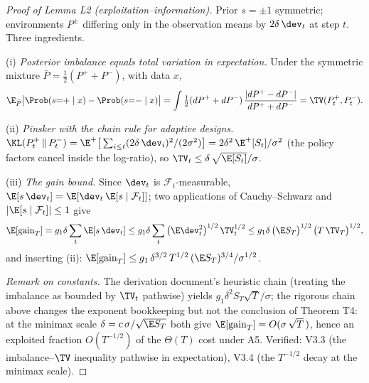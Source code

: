 \documentclass[11pt]{article}
\begin{document}
\begin{proof}[Proof of Lemma L2 (exploitation--information)]
Prior $s = \pm 1$ symmetric; environments $P^{\pm}$ differing only in the
observation means by $2\delta\,\dev_t$ at step $t$. Three ingredients.

(i) \emph{Posterior imbalance equals total variation in expectation.} Under
the symmetric mixture $\bar P = \tfrac{1}{2}(P^+ + P^-)$, with data $x$,
\[
\E_{\bar P}\big|\Prob(s{=}{+}\mid x) - \Prob(s{=}{-}\mid x)\big|
 = \int \tfrac{1}{2}(dP^+ + dP^-)\,
   \frac{|dP^+ - dP^-|}{dP^+ + dP^-}
 = \TV(P^+_t, P^-_t).
\]

(ii) \emph{Pinsker with the chain rule for adaptive designs.}
$\KL(P^+_t \,\|\, P^-_t) = \E^{+}\big[\sum_{i\le t}(2\delta\,\dev_i)^2 /
(2\sigma^2)\big] = 2\delta^2\,\E^{+}[S_t]/\sigma^2$ (the policy factors
cancel inside the log-ratio), so
$\TV_t \le \delta\,\sqrt{\E[S_t]}/\sigma$.

(iii) \emph{The gain bound.} Since $\dev_t$ is
$\mathcal{F}_t$-measurable, $\E[s\,\dev_t] = \E[\dev_t\,\E[s\mid
\mathcal{F}_t]]$; two applications of Cauchy--Schwarz and
$|\E[s\mid\mathcal{F}_t]| \le 1$ give
\[
\E[\mathrm{gain}_T] = g_1\delta\sum_t \E[s\,\dev_t]
 \le g_1\delta \sum_t \big(\E \dev_t^2\big)^{1/2}\,\TV_t^{1/2}
 \le g_1\delta\,\big(\E S_T\big)^{1/2}\,\big(T\,\TV_T\big)^{1/2},
\]
and inserting (ii): $\E[\mathrm{gain}_T] \le g_1\,\delta^{3/2}\,
T^{1/2}\,(\E S_T)^{3/4}/\sigma^{1/2}$.

\emph{Remark on constants.} The derivation document's heuristic chain
(treating the imbalance as bounded by $\TV_t$ pathwise) yields
$g_1\delta^2 S_T\sqrt{T}/\sigma$; the rigorous chain above changes the
exponent bookkeeping but not the conclusion of Theorem T4: at the minimax
scale $\delta = c\,\sigma/\sqrt{\E S_T}$ both give
$\E[\mathrm{gain}_T] = O(\sigma\,\sqrt{T}\,)$, hence an exploited fraction
$O(T^{-1/2})$ of the $\Theta(T)$ cost under A5. Verified: V3.3 (the
imbalance--$\TV$ inequality pathwise in expectation), V3.4 (the
$T^{-1/2}$ decay at the minimax scale).
\end{proof}
\end{document}
